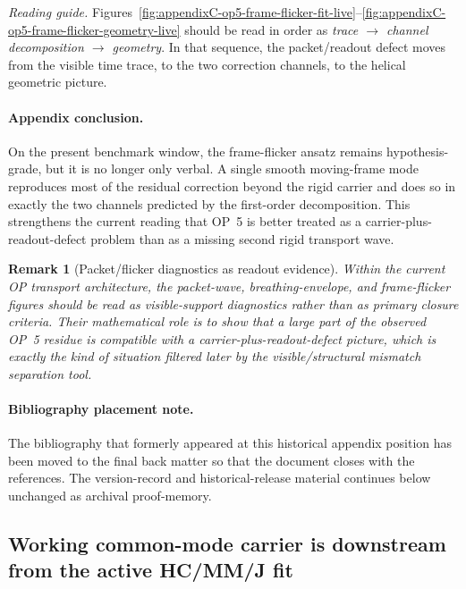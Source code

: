 \documentclass[12pt,a4paper]{article}
\newtheorem{remark}[theorem]{Remark}
\begin{document}
\noindent\textit{Reading guide.} Figures~\ref{fig:appendixC-op5-frame-flicker-fit-live}--\ref{fig:appendixC-op5-frame-flicker-geometry-live} should be read in order as \emph{trace $\rightarrow$ channel decomposition $\rightarrow$ geometry}. In that sequence, the packet/readout defect moves from the visible time trace, to the two correction channels, to the helical geometric picture.

\paragraph{Appendix conclusion.}
On the present benchmark window, the frame-flicker ansatz remains hypothesis-grade, but it is no longer only verbal. A single smooth moving-frame mode reproduces most of the residual correction beyond the rigid carrier and does so in exactly the two channels predicted by the first-order decomposition. This strengthens the current reading that OP~5 is better treated as a carrier-plus-readout-defect problem than as a missing second rigid transport wave.

\begin{remark}[Packet/flicker diagnostics as readout evidence]
Within the current OP transport architecture, the packet-wave, breathing-envelope, and frame-flicker figures should be read as visible-support diagnostics rather than as primary closure criteria. Their mathematical role is to show that a large part of the observed OP~5 residue is compatible with a carrier-plus-readout-defect picture, which is exactly the kind of situation filtered later by the visible/structural mismatch separation tool.
\end{remark}

\paragraph{Bibliography placement note.}
The bibliography that formerly appeared at this historical appendix position has been moved to the final back matter so that the document closes with the references. The version-record and historical-release material continues below unchanged as archival proof-memory.






\subsection*{Working common-mode carrier is downstream from the active HC/MM/J fit}
\end{document}

